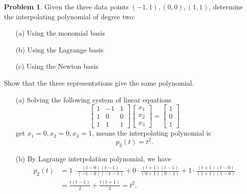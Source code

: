 \documentclass[a4paper]{book}
\makeatletter
\newenvironment{sol}[1][\solname]{\par
  \pushQED{\qed}
  \normalfont \topsep6\p@\@plus6\p@\relax
  \trivlist
  \item[\hskip\labelsep
        \itshape
    #1\@addpunct{.}]\ignorespaces
}{\popQED\endtrivlist\@endpefalse}
\providecommand{\solname}{Solution}
\numberwithin{equation}{chapter}
\theoremstyle{definition}
\newtheorem{pro}{Problem}
\makeatother
\begin{document}
  \begin{pro}
    Given the three data points $(-1, 1), (0, 0), (1, 1)$,
    determine the interpolating polynomial of degree two:
    \begin{itemize}
    \item[(a)]
      Using the monomial basis
  
    \item[(b)]
      Using the Lagrange basis
  
    \item[(c)]
      Using the Newton basis
    \end{itemize}
    Show that the three representations give the same polynomial.
  \end{pro}
  \begin{sol}
    \begin{itemize}
    \item[(a)]
      Solving the following system of linear equations
      \begin{displaymath}
        \begin{bmatrix}
          1 & -1 & 1 \\
          1 & 0 & 0 \\
          1 & 1 & 1
        \end{bmatrix}
        \begin{bmatrix}
          x_1 \\
          x_2 \\
          x_3
        \end{bmatrix}
        =
        \begin{bmatrix}
          1 \\
          0 \\
          1
        \end{bmatrix}
      \end{displaymath}
      get $x_1 = 0, x_2 = 0, x_3 = 1$,
      means the interpolating polynomial is
      \begin{displaymath}
        p_2(t) = t^2.
      \end{displaymath}
  
    \item[(b)]
      By Lagrange interpolation polynomial, we have
      \begin{align*}
        p_2(t) &= 1\cdot \frac{(t-0)(t-1)}{(-1-0)(-1-1)}
        + 0\cdot \frac{(t+1)(t-1)}{(0+1)(0-1)}
                 + 1\cdot \frac{(t+1)(t-0)}{(1+1)(1-0)} \\
               &= \frac{t(t-1)}{2} + \frac{t(t+1)}{2} 
        = t^2.
      \end{align*}
  

\end{itemize}
\end{sol}
\end{document}
